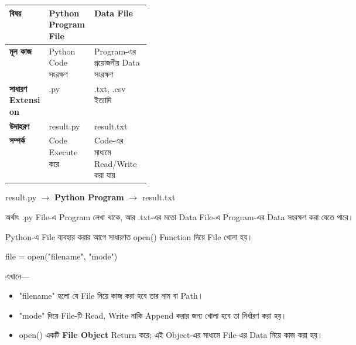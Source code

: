 

\begin{tabularx}{\linewidth}{|>{\bfseries\RaggedRight\arraybackslash}p{0.28\linewidth}|Y|Y|}
\hline
{}
\textbf{বিষয়} & \textbf{Python Program File} & \textbf{Data File}\\
\hline
মূল কাজ & Python Code সংরক্ষণ & Program-এর প্রয়োজনীয় Data সংরক্ষণ\\
\hline
সাধারণ Extension & \textenglish{\ttfamily .py} & \textenglish{\ttfamily .txt}, \textenglish{\ttfamily .csv} ইত্যাদি\\
\hline
উদাহরণ & \textenglish{\ttfamily result.py} & \textenglish{\ttfamily result.txt}\\
\hline
সম্পর্ক & Code Execute করে & Code-এর মাধ্যমে Read/Write করা যায়\\
\hline
\end{tabularx}

\begin{center}
\textenglish{\ttfamily result.py}
\(\longrightarrow\)
\textbf{Python Program}
\(\longrightarrow\)
\textenglish{\ttfamily result.txt}
\end{center}

অর্থাৎ \textenglish{\ttfamily .py} File-এ Program লেখা থাকে, আর
\textenglish{\ttfamily .txt}-এর মতো Data File-এ Program-এর Data
সংরক্ষণ করা যেতে পারে।



Python-এ File ব্যবহার করার আগে সাধারণত \textenglish{\ttfamily open()}
Function দিয়ে File খোলা হয়।

\begin{center}
\textenglish{\ttfamily file = open("filename", "mode")}
\end{center}

এখানে—

\begin{itemize}
\item \textenglish{\ttfamily "filename"} হলো যে File নিয়ে কাজ করা হবে তার নাম বা Path।
\item \textenglish{\ttfamily "mode"} দিয়ে File-টি Read, Write নাকি Append করার জন্য খোলা হবে তা নির্ধারণ করা হয়।
\item \textenglish{\ttfamily open()} একটি \textbf{File Object} Return করে; এই Object-এর মাধ্যমে File-এর Data নিয়ে কাজ করা হয়।
\end{itemize}

